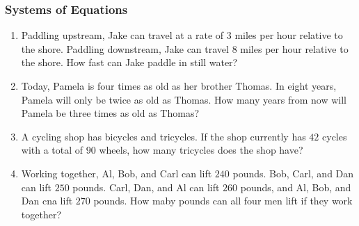 \documentclass{article}
\begin{document}
    \subsubsection*{Systems of Equations}
    \begin{enumerate}[resume]
        \item Paddling upstream, Jake can travel at a rate of $3$ miles per hour
        relative to the shore. Paddling downstream, Jake can travel $8$ miles
        per hour relative to the shore. How fast can Jake paddle in still water?
        \vspace{3cm}
        \item Today, Pamela is four times as old as her brother Thomas. In eight
        years, Pamela will only be twice as old as Thomas. How many years from
        now will Pamela be three times as old as Thomas?
        \vspace{3cm}
        \item A cycling shop has bicycles and tricycles. If the shop currently
        has $42$ cycles with a total of $90$ wheels, how many tricycles does the
        shop have?
        \vspace{3cm}
        \item Working together, Al, Bob, and Carl can lift $240$ pounds. Bob,
        Carl, and Dan can lift $250$ pounds. Carl, Dan, and Al can lift $260$
        pounds, and Al, Bob, and Dan cna lift $270$ pounds. How maby pounds can
        all four men lift if they work together?
        \vspace{3cm}
    \end{enumerate}
\end{document}

